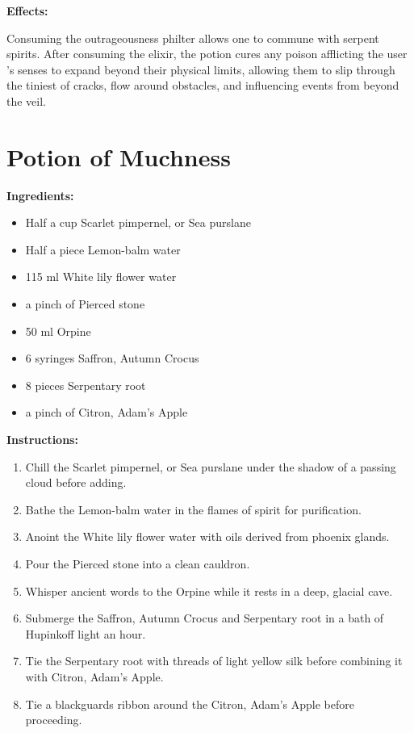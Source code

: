 \documentclass{article}
\begin{document}
\textbf{Effects:}

Consuming the outrageousness philter allows one to commune with serpent spirits. After consuming the elixir, the potion cures any poison afflicting the user 's senses to expand beyond their physical limits, allowing them to slip through the tiniest of cracks, flow around obstacles, and influencing events from beyond the veil.

\newpage
\section*{Potion of Muchness}

\textbf{Ingredients:}

\begin{itemize}
  \item Half a cup Scarlet pimpernel, or Sea purslane
  \item Half a piece Lemon-balm water
  \item 115 ml White lily flower water
  \item a pinch of Pierced stone
  \item 50 ml Orpine
  \item 6 syringes Saffron, Autumn Crocus
  \item 8 pieces Serpentary root
  \item a pinch of Citron, Adam's Apple
\end{itemize}

\textbf{Instructions:}

\begin{enumerate}
  \item Chill the Scarlet pimpernel, or Sea purslane under the shadow of a passing cloud before adding.
  \item Bathe the Lemon-balm water in the flames of spirit for purification.
  \item Anoint the White lily flower water with oils derived from phoenix glands.
  \item Pour the Pierced stone into a clean cauldron.
  \item Whisper ancient words to the Orpine while it rests in a deep, glacial cave.
  \item Submerge the Saffron, Autumn Crocus and Serpentary root in a bath of Hupinkoff light an hour.
  \item Tie the Serpentary root with threads of light yellow silk before combining it with Citron, Adam's Apple.
  \item Tie a blackguards ribbon around the Citron, Adam's Apple before proceeding.
\end{enumerate}
\end{document}
